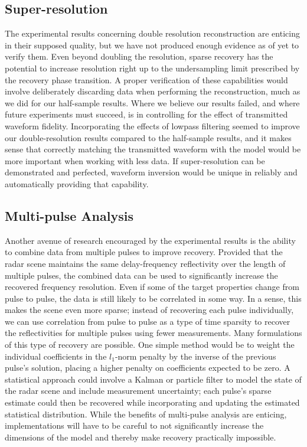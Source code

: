 \subsection{Super-resolution}
The experimental results concerning double resolution reconstruction are enticing in their supposed quality, but we have not produced enough evidence as of yet to verify them. Even beyond doubling the resolution, sparse recovery has the potential to increase resolution right up to the undersampling limit prescribed by the recovery phase transition. A proper verification of these capabilities would involve deliberately discarding data when performing the reconstruction, much as we did for our half-sample results. Where we believe our results failed, and where future experiments must succeed, is in controlling for the effect of transmitted waveform fidelity. Incorporating the effects of lowpass filtering seemed to improve our double-resolution results compared to the half-sample results, and it makes sense that correctly matching the transmitted waveform with the model would be more important when working with less data. If super-resolution can be demonstrated and perfected, waveform inversion would be unique in reliably and automatically providing that capability.

\subsection{Multi-pulse Analysis}
Another avenue of research encouraged by the experimental results is the ability to combine data from multiple pulses to improve recovery. Provided that the radar scene maintains the same delay-frequency reflectivity over the length of multiple pulses, the combined data can be used to significantly increase the recovered frequency resolution. Even if some of the target properties change from pulse to pulse, the data is still likely to be correlated in some way. In a sense, this makes the scene even more sparse; instead of recovering each pulse individually, we can use correlation from pulse to pulse as a type of time sparsity to recover the reflectivities for multiple pulses using fewer measurements. Many formulations of this type of recovery are possible. One simple method would be to weight the individual coefficients in the $l_1$-norm penalty by the inverse of the previous pulse's solution, placing a higher penalty on coefficients expected to be zero. A statistical approach could involve a Kalman or particle filter to model the state of the radar scene and include measurement uncertainty; each pulse's sparse estimate could then be recovered while incorporating and updating the estimated statistical distribution. While the benefits of multi-pulse analysis are enticing, implementations will have to be careful to not significantly increase the dimensions of the model and thereby make recovery practically impossible.

